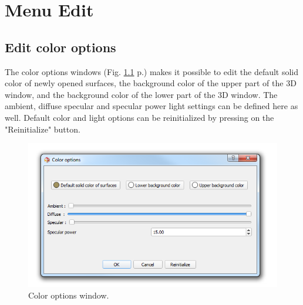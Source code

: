 




\chapter{Menu Edit}
\minitoc  

\section{Edit color options}

\noindent
The color options windows (Fig. \ref{color_options} p.\pageref{color_options}) makes it possible to edit the default solid color of newly opened surfaces, the background color of the upper part of the 3D window, and the background color of the lower part of the 3D window. The ambient, diffuse specular and specular power light settings can be defined here as well. Default color and light options can be reinitialized by pressing on the "Reinitialize" button.

\begin{figure}
  \centering
  \includegraphics[scale=0.55]{images/08/color_options.png} 
	\caption{Color options window.}
\label{color_options}
 
\end{figure}



